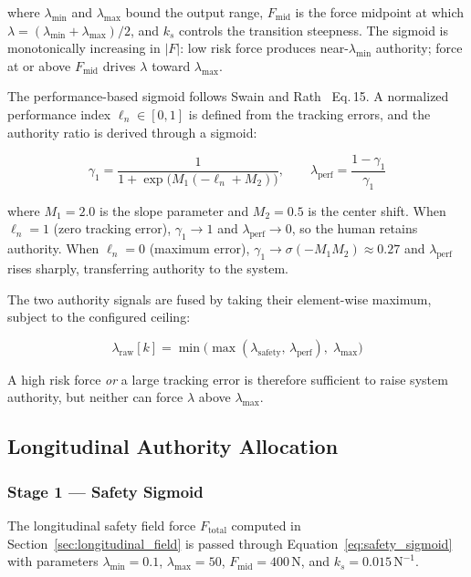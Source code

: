 \documentclass[12pt,a4paper,oneside]{report}
\begin{document}
where $\lambda_{\min}$ and $\lambda_{\max}$ bound the output range, $F_{\mathrm{mid}}$ is the force midpoint at which $\lambda = (\lambda_{\min} + \lambda_{\max})/2$, and $k_s$ controls the transition steepness. The sigmoid is monotonically increasing in $|F|$: low risk force produces near-$\lambda_{\min}$ authority; force at or above $F_{\mathrm{mid}}$ drives $\lambda$ toward $\lambda_{\max}$.

The performance-based sigmoid follows Swain and Rath~\cite{swainCooperativeGameTheory2023} Eq.\,15. A normalized performance index $\ell_n \in [0, 1]$ is defined from the tracking errors, and the authority ratio is derived through a sigmoid:

\begin{equation}
\gamma_1 = \frac{1}{1 + \exp\!\bigl(M_1(-\ell_n + M_2)\bigr)}, \qquad
\lambda_{\mathrm{perf}} = \frac{1 - \gamma_1}{\gamma_1}
\label{eq:swain_rath}
\end{equation}

where $M_1 = 2.0$ is the slope parameter and $M_2 = 0.5$ is the center shift. When $\ell_n = 1$ (zero tracking error), $\gamma_1 \to 1$ and $\lambda_{\mathrm{perf}} \to 0$, so the human retains authority. When $\ell_n = 0$ (maximum error), $\gamma_1 \to \sigma(-M_1 M_2) \approx 0.27$ and $\lambda_{\mathrm{perf}}$ rises sharply, transferring authority to the system.

The two authority signals are fused by taking their element-wise maximum, subject to the configured ceiling:

\begin{equation}
\lambda_{\mathrm{raw}}[k] = \min\!\bigl(\max(\lambda_{\mathrm{safety}},\, \lambda_{\mathrm{perf}}),\; \lambda_{\max}\bigr)
\label{eq:lambda_fusion}
\end{equation}

A high risk force \emph{or} a large tracking error is therefore sufficient to raise system authority, but neither can force $\lambda$ above $\lambda_{\max}$.

\subsection{Longitudinal Authority Allocation}
\label{sec:long_authority}

\subsubsection{Stage 1 — Safety Sigmoid}

The longitudinal safety field force $F_{\mathrm{total}}$ computed in Section~\ref{sec:longitudinal_field} is passed through Equation~\ref{eq:safety_sigmoid} with parameters $\lambda_{\min} = 0.1$, $\lambda_{\max} = 50$, $F_{\mathrm{mid}} = 400\,\mathrm{N}$, and $k_s = 0.015\,\mathrm{N}^{-1}$.
\end{document}
